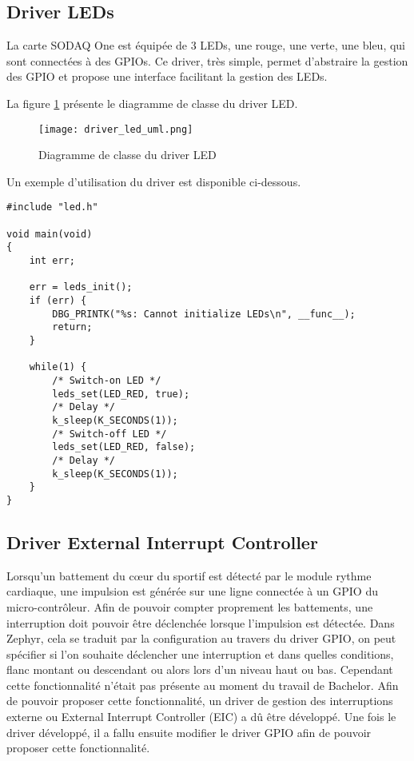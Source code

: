\subsection{Driver LEDs}

La carte SODAQ One est équipée de 3 LEDs, une rouge, une verte, une bleu, qui sont connectées à des GPIOs. Ce driver, très simple, permet d'abstraire la gestion des GPIO et propose une interface facilitant la gestion des LEDs.

La figure \ref{fig:driver_led_uml} présente le diagramme de classe du driver LED.

\begin{figure}[htb]
\centering 
\texttt{[image: driver\_led\_uml.png]} 
\caption{Diagramme de classe du driver LED}
\label{fig:driver_led_uml}
\end{figure}

Un exemple d'utilisation du driver est disponible ci-dessous.

\begin{lstlisting}[style=CStyle]
#include "led.h"

void main(void)
{
	int err;

	err = leds_init();
	if (err) {
		DBG_PRINTK("%s: Cannot initialize LEDs\n", __func__);
		return;
	}
	
	while(1) {
		/* Switch-on LED */
		leds_set(LED_RED, true);
		/* Delay */
		k_sleep(K_SECONDS(1));
		/* Switch-off LED */
		leds_set(LED_RED, false);
		/* Delay */
		k_sleep(K_SECONDS(1));		
	}
}
\end{lstlisting}

\subsection{Driver External Interrupt Controller}

Lorsqu'un battement du cœur du sportif est détecté par le module rythme cardiaque, une impulsion est générée sur une ligne connectée à un GPIO du micro-contrôleur. Afin de pouvoir compter proprement les battements, une interruption doit pouvoir être déclenchée lorsque l'impulsion est détectée. Dans Zephyr, cela se traduit par la configuration au travers du driver GPIO, on peut spécifier si l'on souhaite déclencher une interruption et dans quelles conditions, flanc montant ou descendant ou alors lors d'un niveau haut ou bas. Cependant cette fonctionnalité n'était pas présente au moment du travail de Bachelor. Afin de pouvoir proposer cette fonctionnalité, un driver de gestion des interruptions externe ou External Interrupt Controller (EIC) a dû être développé. Une fois le driver développé, il a fallu ensuite modifier le driver GPIO afin de pouvoir proposer cette fonctionnalité.


